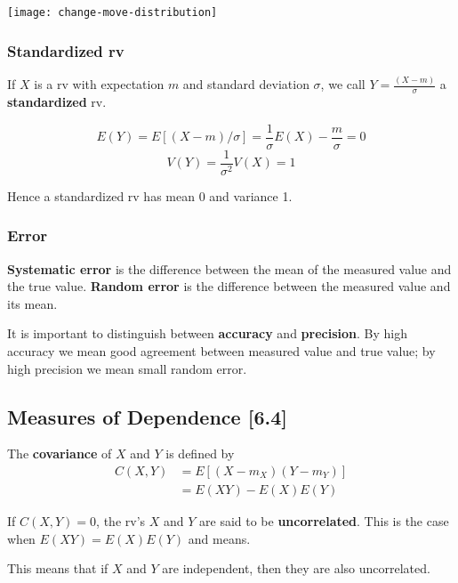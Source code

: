 \documentclass[a4paper,9pt]{extarticle}
\begin{document}
\begin{multicols*}{2}
{\centering \texttt{[image: change-move-distribution]} \par}

\subsubsection{Standardized rv}

If $X$ is a rv with expectation $m$ and standard deviation $\sigma$, we call $Y = \frac{(X - m)}{\sigma}$ a \textbf{standardized} rv.

\begin{equation}
    E(Y) = E[(X - m) / \sigma] = \frac{1}{\sigma} E(X) - \frac{m}{\sigma} = 0
\end{equation}
\begin{equation}
    V(Y) = \frac{1}{\sigma^2} V(X) = 1
\end{equation}

Hence a standardized rv has mean 0 and variance 1.

\subsubsection{Error}

\textbf{Systematic error} is the difference between the mean of the measured value and the true value. \textbf{Random error} is the difference between the measured value and its mean.

It is important to distinguish between \textbf{accuracy} and \textbf{precision}. By high accuracy we mean good agreement between measured value and true value; by high precision we mean small random error.

\subsection{Measures of Dependence [6.4]}
The \textbf{covariance} of $X$ and $Y$ is defined by
\begin{equation}
    \begin{split}
        C(X,Y) & = E[(X - m_X)(Y - m_Y)] \\
        & = E(XY) - E(X) E(Y)
    \end{split}
\end{equation}

If $C(X, Y) = 0$, the rv's $X$ and $Y$ are said to be \textbf{uncorrelated}. This is the case when $E(XY) = E(X)E(Y)$ and means.

This means that if $X$ and $Y$ are independent, then they are also uncorrelated.


\end{multicols*}
\end{document}
